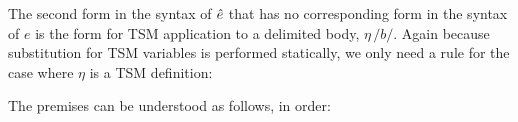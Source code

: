 The second form in the syntax of $\ue$ that has no corresponding form in the syntax of $e$ is the form for TSM application to a delimited body, $\eta\,\texttt{/}b\texttt{/}$. Again because substitution for TSM variables is performed statically, we only need a rule for the case where $\eta$ is a TSM definition:
\begin{mathpar}
\end{mathpar}
The premises can be understood as follows, in order:
